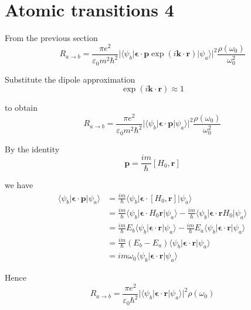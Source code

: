 

\section*{Atomic transitions 4}

From the previous section
\begin{equation*}
R_{a\rightarrow b}
=\frac{\pi e^2}{\varepsilon_0m^2\hbar^2}
\bigl|\langle\psi_b|\boldsymbol{\epsilon}\cdot\mathbf p\exp(i\mathbf k\cdot\mathbf r)|\psi_a\rangle\bigr|^2
\frac{\rho(\omega_0)}{\omega_0^2}
\end{equation*}

Substitute the dipole approximation
\begin{equation*}
\exp(i\mathbf k\cdot\mathbf r)\approx1
\end{equation*}

to obtain
\begin{equation*}
R_{a\rightarrow b}
=\frac{\pi e^2}{\varepsilon_0m^2\hbar^2}
\bigl|\langle\psi_b|\boldsymbol{\epsilon}\cdot\mathbf p|\psi_a\rangle\bigr|^2
\frac{\rho(\omega_0)}{\omega_0^2}
\end{equation*}

By the identity
\begin{equation*}
\mathbf p=\frac{im}{\hbar}[H_0,\mathbf r]
\tag{1}
\end{equation*}

we have
\begin{align*}
\langle\psi_b|\boldsymbol{\epsilon}\cdot\mathbf p|\psi_a\rangle
&=\frac{im}{\hbar}\langle\psi_b|\boldsymbol{\epsilon}\cdot[H_0,\mathbf r]|\psi_a\rangle
\\
&=\frac{im}{\hbar}\langle\psi_b|\boldsymbol{\epsilon}\cdot H_0\mathbf r|\psi_a\rangle
-\frac{im}{\hbar}\langle\psi_b|\boldsymbol{\epsilon}\cdot\mathbf rH_0|\psi_a\rangle
\\
&=\frac{im}{\hbar}E_b\langle\psi_b|\boldsymbol{\epsilon}\cdot\mathbf r|\psi_a\rangle
-\frac{im}{\hbar}E_a\langle\psi_b|\boldsymbol{\epsilon}\cdot\mathbf r|\psi_a\rangle
\\
&=\frac{im}{\hbar}(E_b-E_a)\langle\psi_b|\boldsymbol{\epsilon}\cdot\mathbf r|\psi_a\rangle
\\
&=im\omega_0\langle\psi_b|\boldsymbol{\epsilon}\cdot\mathbf r|\psi_a\rangle
\end{align*}

Hence
\begin{equation*}
R_{a\rightarrow b}
=\frac{\pi e^2}{\varepsilon_0\hbar^2}
\bigl|\langle\psi_b|\boldsymbol{\epsilon}\cdot\mathbf r|\psi_a\rangle\bigr|^2
\rho(\omega_0)
\end{equation*}

